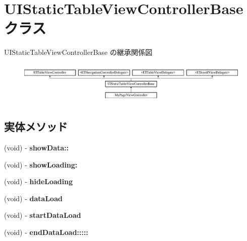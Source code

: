 \hypertarget{interface_u_i_static_table_view_controller_base}{}\section{U\+I\+Static\+Table\+View\+Controller\+Base クラス}
\label{interface_u_i_static_table_view_controller_base}
U\+I\+Static\+Table\+View\+Controller\+Base の継承関係図\begin{figure}[H]
\begin{center}
\leavevmode
\includegraphics[height=1.990521cm]{interface_u_i_static_table_view_controller_base}
\end{center}
\end{figure}
\subsection*{実体メソッド}
\begin{DoxyCompactItemize}
\item 
\hypertarget{interface_u_i_static_table_view_controller_base_ae5fd567c79540fb45871fce805ccb392}{}(void) -\/ {\bfseries show\+Data\+::}\label{interface_u_i_static_table_view_controller_base_ae5fd567c79540fb45871fce805ccb392}

\item 
\hypertarget{interface_u_i_static_table_view_controller_base_a146811c12bb052fe68d69efd53983e98}{}(void) -\/ {\bfseries show\+Loading\+:}\label{interface_u_i_static_table_view_controller_base_a146811c12bb052fe68d69efd53983e98}

\item 
\hypertarget{interface_u_i_static_table_view_controller_base_a96f7f215a953f3904b5a3ae4891ee814}{}(void) -\/ {\bfseries hide\+Loading}\label{interface_u_i_static_table_view_controller_base_a96f7f215a953f3904b5a3ae4891ee814}

\item 
\hypertarget{interface_u_i_static_table_view_controller_base_a9993fd25e28f137164e8f7209e61d34e}{}(void) -\/ {\bfseries data\+Load}\label{interface_u_i_static_table_view_controller_base_a9993fd25e28f137164e8f7209e61d34e}

\item 
\hypertarget{interface_u_i_static_table_view_controller_base_aa86af5770820963a608789936292032c}{}(void) -\/ {\bfseries start\+Data\+Load}\label{interface_u_i_static_table_view_controller_base_aa86af5770820963a608789936292032c}

\item 
\hypertarget{interface_u_i_static_table_view_controller_base_aa11d1570632a9014209cb5f88def19d0}{}(void) -\/ {\bfseries end\+Data\+Load\+:::::}\label{interface_u_i_static_table_view_controller_base_aa11d1570632a9014209cb5f88def19d0}

\end{DoxyCompactItemize}
